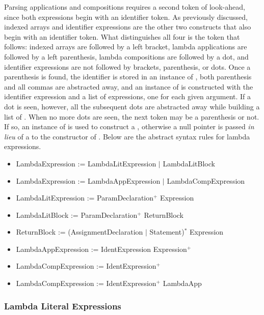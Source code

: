 Parsing applications and compositions requires a second token of look-ahead, since both expressions begin with an identifier token. As previously discussed, indexed arrays and identifier expressions are the other two constructs that also begin with an identifier token. What distinguishes all four is the token that follows: indexed arrays are followed by a left bracket, lambda applications are followed by a left parenthesis, lambda compositions are followed by a dot, and identifier expressions are not followed by brackets, parenthesis, or dots. Once a parenthesis is found, the identifier is stored in an instance of , both parenthesis and all commas are abstracted away, and an instance of  is constructed with the identifier expression and a list of expressions, one for each given argument. If a dot is seen, however, all the subsequent dots are abstracted away while building a list of . When no more dots are seen, the next token may be a parenthesis or not. If so, an instance of  is used to construct a , otherwise a null pointer is passed \emph{in lieu} of a  to the constructor of . Below are the abstract syntax rules for lambda expressions.

\begin{itemize}
	\item LambdaExpression := LambdaLitExpression $|$ LambdaLitBlock
	\item LambdaExpression := LambdaAppExpression $|$ LambdaCompExpression
	\item LambdaLitExpression := ParamDeclaration$^+$ Expression
	\item LambdaLitBlock := ParamDeclaration$^+$ ReturnBlock
	\item ReturnBlock := (AssignmentDeclaration $|$ Statement)$^*$ Expression
	\item LambdaAppExpression := IdentExpression Expression$^+$
	\item LambdaCompExpression := IdentExpression$^+$
	\item LambdaCompExpression := IdentExpression$^+$ LambdaApp
\end{itemize}

\subsubsection{Lambda Literal Expressions}

